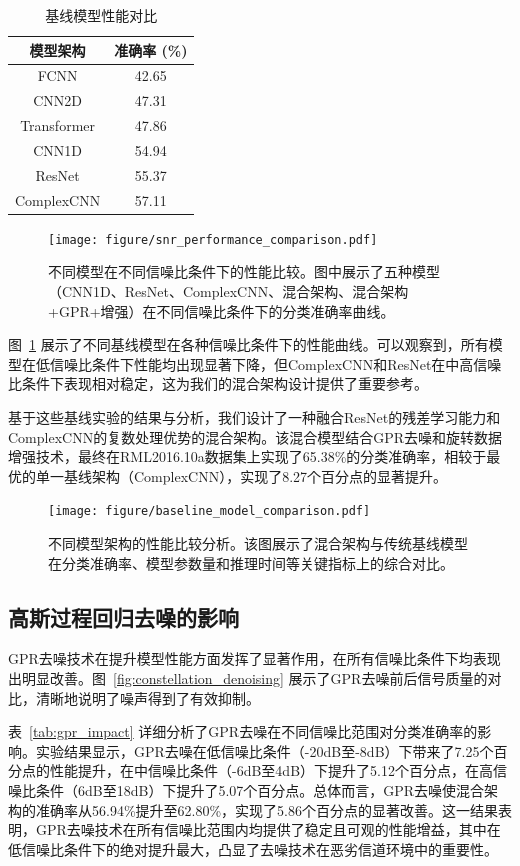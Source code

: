 \documentclass{article}
\begin{document}
\begin{table}[!htbp]
\centering
\caption{基线模型性能对比}
\label{tab:baseline_comparison}
\begin{tabular}{@{}cc@{}}
\toprule
模型架构 & 准确率 (\%) \\
\midrule
FCNN & 42.65 \\
CNN2D & 47.31 \\
Transformer & 47.86 \\
CNN1D & 54.94 \\
ResNet & 55.37 \\
ComplexCNN & 57.11 \\
\bottomrule
\end{tabular}
\end{table}

\begin{figure}[htbp]
\centering
\texttt{[image: figure/snr\_performance\_comparison.pdf]}
\caption{不同模型在不同信噪比条件下的性能比较。图中展示了五种模型（CNN1D、ResNet、ComplexCNN、混合架构、混合架构+GPR+增强）在不同信噪比条件下的分类准确率曲线。}
\label{fig:snr_performance}
\end{figure}

图~\ref{fig:snr_performance} 展示了不同基线模型在各种信噪比条件下的性能曲线。可以观察到，所有模型在低信噪比条件下性能均出现显著下降，但ComplexCNN和ResNet在中高信噪比条件下表现相对稳定，这为我们的混合架构设计提供了重要参考。

基于这些基线实验的结果与分析，我们设计了一种融合ResNet的残差学习能力和ComplexCNN的复数处理优势的混合架构。该混合模型结合GPR去噪和旋转数据增强技术，最终在RML2016.10a数据集上实现了65.38\%的分类准确率，相较于最优的单一基线架构（ComplexCNN），实现了8.27个百分点的显著提升。

\begin{figure}[htbp]
\centering
\texttt{[image: figure/baseline\_model\_comparison.pdf]}
\caption{不同模型架构的性能比较分析。该图展示了混合架构与传统基线模型在分类准确率、模型参数量和推理时间等关键指标上的综合对比。}
\label{fig:model_comparison}
\end{figure}

\subsection{高斯过程回归去噪的影响}
GPR去噪技术在提升模型性能方面发挥了显著作用，在所有信噪比条件下均表现出明显改善。图~\ref{fig:constellation_denoising} 展示了GPR去噪前后信号质量的对比，清晰地说明了噪声得到了有效抑制。

表~\ref{tab:gpr_impact} 详细分析了GPR去噪在不同信噪比范围对分类准确率的影响。实验结果显示，GPR去噪在低信噪比条件（-20dB至-8dB）下带来了7.25个百分点的性能提升，在中信噪比条件（-6dB至4dB）下提升了5.12个百分点，在高信噪比条件（6dB至18dB）下提升了5.07个百分点。总体而言，GPR去噪使混合架构的准确率从56.94\%提升至62.80\%，实现了5.86个百分点的显著改善。这一结果表明，GPR去噪技术在所有信噪比范围内均提供了稳定且可观的性能增益，其中在低信噪比条件下的绝对提升最大，凸显了去噪技术在恶劣信道环境中的重要性。
\end{document}
